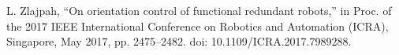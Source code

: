 \documentclass[letterpaper, 10 pt, conference]{ieeeconf}  %
\begin{document}
\begin{thebibliography}{99}

L. Zlajpah, “On orientation control of functional redundant robots,” in Proc. of the 2017 IEEE International Conference on Robotics and Automation (ICRA), Singapore, May 2017, pp. 2475–2482. doi: 10.1109/ICRA.2017.7989288.



\end{thebibliography}
\end{document}
